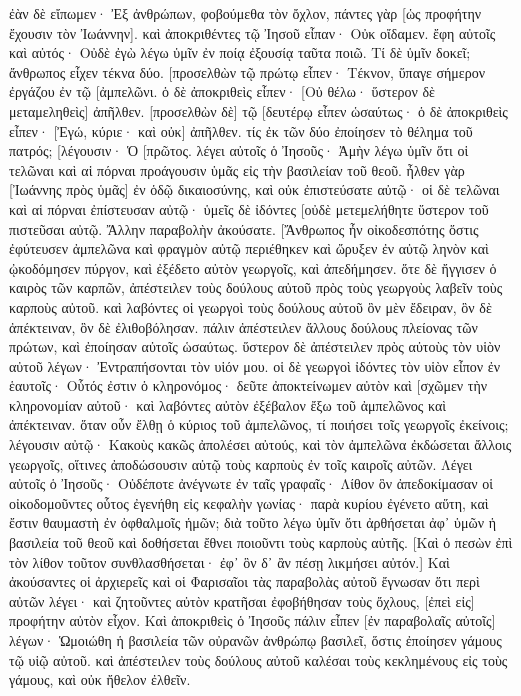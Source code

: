 ἐὰν δὲ εἴπωμεν· Ἐξ ἀνθρώπων, φοβούμεθα τὸν ὄχλον, πάντες γὰρ [ὡς προφήτην ἔχουσιν τὸν Ἰωάννην]. 
καὶ ἀποκριθέντες τῷ Ἰησοῦ εἶπαν· Οὐκ οἴδαμεν. ἔφη αὐτοῖς καὶ αὐτός· Οὐδὲ ἐγὼ λέγω ὑμῖν ἐν ποίᾳ ἐξουσίᾳ ταῦτα ποιῶ. 
Τί δὲ ὑμῖν δοκεῖ; ἄνθρωπος εἶχεν τέκνα δύο. [προσελθὼν τῷ πρώτῳ εἶπεν· Τέκνον, ὕπαγε σήμερον ἐργάζου ἐν τῷ [ἀμπελῶνι. 
ὁ δὲ ἀποκριθεὶς εἶπεν· [Οὐ θέλω· ὕστερον δὲ μεταμεληθεὶς] ἀπῆλθεν. 
[προσελθὼν δὲ] τῷ [δευτέρῳ εἶπεν ὡσαύτως· ὁ δὲ ἀποκριθεὶς εἶπεν· [Ἐγώ, κύριε· καὶ οὐκ] ἀπῆλθεν. 
τίς ἐκ τῶν δύο ἐποίησεν τὸ θέλημα τοῦ πατρός; [λέγουσιν· Ὁ [πρῶτος. λέγει αὐτοῖς ὁ Ἰησοῦς· Ἀμὴν λέγω ὑμῖν ὅτι οἱ τελῶναι καὶ αἱ πόρναι προάγουσιν ὑμᾶς εἰς τὴν βασιλείαν τοῦ θεοῦ. 
ἦλθεν γὰρ [Ἰωάννης πρὸς ὑμᾶς] ἐν ὁδῷ δικαιοσύνης, καὶ οὐκ ἐπιστεύσατε αὐτῷ· οἱ δὲ τελῶναι καὶ αἱ πόρναι ἐπίστευσαν αὐτῷ· ὑμεῖς δὲ ἰδόντες [οὐδὲ μετεμελήθητε ὕστερον τοῦ πιστεῦσαι αὐτῷ. 
Ἄλλην παραβολὴν ἀκούσατε. [Ἄνθρωπος ἦν οἰκοδεσπότης ὅστις ἐφύτευσεν ἀμπελῶνα καὶ φραγμὸν αὐτῷ περιέθηκεν καὶ ὤρυξεν ἐν αὐτῷ ληνὸν καὶ ᾠκοδόμησεν πύργον, καὶ ἐξέδετο αὐτὸν γεωργοῖς, καὶ ἀπεδήμησεν. 
ὅτε δὲ ἤγγισεν ὁ καιρὸς τῶν καρπῶν, ἀπέστειλεν τοὺς δούλους αὐτοῦ πρὸς τοὺς γεωργοὺς λαβεῖν τοὺς καρποὺς αὐτοῦ. 
καὶ λαβόντες οἱ γεωργοὶ τοὺς δούλους αὐτοῦ ὃν μὲν ἔδειραν, ὃν δὲ ἀπέκτειναν, ὃν δὲ ἐλιθοβόλησαν. 
πάλιν ἀπέστειλεν ἄλλους δούλους πλείονας τῶν πρώτων, καὶ ἐποίησαν αὐτοῖς ὡσαύτως. 
ὕστερον δὲ ἀπέστειλεν πρὸς αὐτοὺς τὸν υἱὸν αὐτοῦ λέγων· Ἐντραπήσονται τὸν υἱόν μου. 
οἱ δὲ γεωργοὶ ἰδόντες τὸν υἱὸν εἶπον ἐν ἑαυτοῖς· Οὗτός ἐστιν ὁ κληρονόμος· δεῦτε ἀποκτείνωμεν αὐτὸν καὶ [σχῶμεν τὴν κληρονομίαν αὐτοῦ· 
καὶ λαβόντες αὐτὸν ἐξέβαλον ἔξω τοῦ ἀμπελῶνος καὶ ἀπέκτειναν. 
ὅταν οὖν ἔλθῃ ὁ κύριος τοῦ ἀμπελῶνος, τί ποιήσει τοῖς γεωργοῖς ἐκείνοις; 
λέγουσιν αὐτῷ· Κακοὺς κακῶς ἀπολέσει αὐτούς, καὶ τὸν ἀμπελῶνα ἐκδώσεται ἄλλοις γεωργοῖς, οἵτινες ἀποδώσουσιν αὐτῷ τοὺς καρποὺς ἐν τοῖς καιροῖς αὐτῶν. 
Λέγει αὐτοῖς ὁ Ἰησοῦς· Οὐδέποτε ἀνέγνωτε ἐν ταῖς γραφαῖς· Λίθον ὃν ἀπεδοκίμασαν οἱ οἰκοδομοῦντες οὗτος ἐγενήθη εἰς κεφαλὴν γωνίας· παρὰ κυρίου ἐγένετο αὕτη, καὶ ἔστιν θαυμαστὴ ἐν ὀφθαλμοῖς ἡμῶν; 
διὰ τοῦτο λέγω ὑμῖν ὅτι ἀρθήσεται ἀφ᾽ ὑμῶν ἡ βασιλεία τοῦ θεοῦ καὶ δοθήσεται ἔθνει ποιοῦντι τοὺς καρποὺς αὐτῆς. 
[Καὶ ὁ πεσὼν ἐπὶ τὸν λίθον τοῦτον συνθλασθήσεται· ἐφ᾽ ὃν δ᾽ ἂν πέσῃ λικμήσει αὐτόν.] 
Καὶ ἀκούσαντες οἱ ἀρχιερεῖς καὶ οἱ Φαρισαῖοι τὰς παραβολὰς αὐτοῦ ἔγνωσαν ὅτι περὶ αὐτῶν λέγει· 
καὶ ζητοῦντες αὐτὸν κρατῆσαι ἐφοβήθησαν τοὺς ὄχλους, [ἐπεὶ εἰς] προφήτην αὐτὸν εἶχον. 
Καὶ ἀποκριθεὶς ὁ Ἰησοῦς πάλιν εἶπεν [ἐν παραβολαῖς αὐτοῖς] λέγων· 
Ὡμοιώθη ἡ βασιλεία τῶν οὐρανῶν ἀνθρώπῳ βασιλεῖ, ὅστις ἐποίησεν γάμους τῷ υἱῷ αὐτοῦ. 
καὶ ἀπέστειλεν τοὺς δούλους αὐτοῦ καλέσαι τοὺς κεκλημένους εἰς τοὺς γάμους, καὶ οὐκ ἤθελον ἐλθεῖν. 
